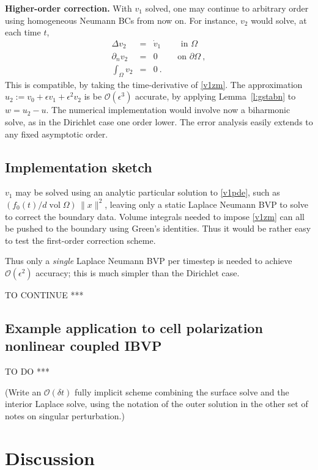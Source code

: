 \documentclass[10pt]{article}
\newcommand{\bea}{\begin{eqnarray}}
\newcommand{\eea}{\end{eqnarray}}
\newcommand{\bigO}{{\mathcal O}}
\DeclareMathOperator{\vol}{vol}
\newcommand{\pO}{{\partial\Omega}}
\newcommand{\eps}{\epsilon}
\newcommand{\dn}{\partial_n}
\begin{document}
{\bf Higher-order correction.}
With $v_1$ solved,
one may continue to arbitrary order using homogeneous Neumann BCs
from now on.
For instance, $v_2$ would solve, at each time $t$,
\bea
\Delta v_2 &=& \dot v_1 \qquad \mbox{ in } \Omega
\\
\dn v_2 &=& 0 \qquad \mbox{ on } \pO~,
\\
\int_\Omega v_2 &=& 0~.
\eea
This is compatible, by taking the time-derivative of \eqref{v1zm}.
The approximation $u_2:=v_0+\eps v_1 + \eps^2 v_2$ is be $\bigO(\eps^3)$
accurate, by applying Lemma~\ref{l:gstabn} to $w = u_2-u$.
The numerical implementation would involve now a biharmonic solve,
as in the Dirichlet case one order lower.
The error analysis easily extends to any fixed asymptotic order.



\subsection{Implementation sketch}

$v_1$ may be solved using an analytic particular solution to \eqref{v1pde},
such as $(f_0(t)/d \vol\Omega)\,\|x\|^2$, leaving
only a static Laplace Neumann BVP to solve to correct the boundary data.
Volume integrals needed to impose \eqref{v1zm} can all be pushed
to the boundary using Green's identities.
Thus it would be rather easy to test the first-order correction scheme.

Thus only a {\em single} Laplace Neumann BVP per timestep is needed
to achieve $\bigO(\eps^2)$ accuracy; this is much simpler than
the Dirichlet case.

TO CONTINUE ***


\subsection{Example application to cell polarization nonlinear coupled IBVP}


TO DO ***

(Write an $\bigO(\delta t)$ fully implicit scheme combining
the surface solve and the interior Laplace solve,
using the notation of the outer solution in the other set of notes on
singular perturbation.)






\section{Discussion}
\end{document}

